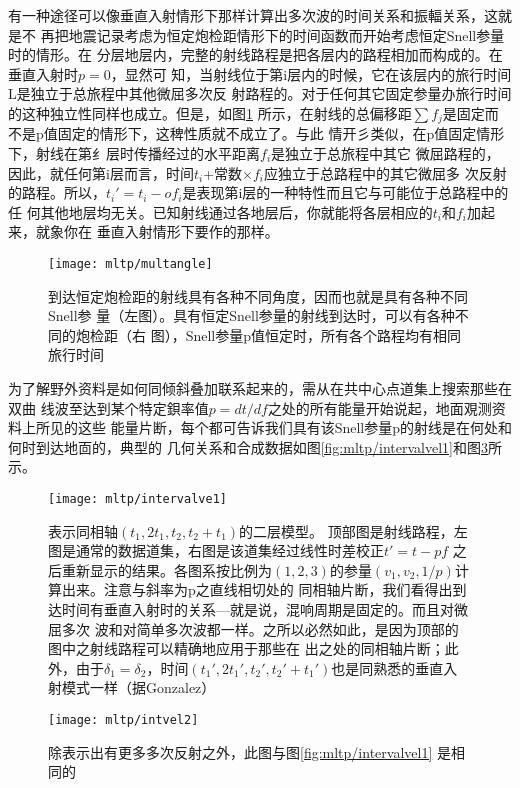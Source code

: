 有一种途径可以像垂直入射情形下那样计算出多次波的时间关系和振輻关系，这就是不
再把地震记录考虑为恒定炮检距情形下的时间函数而开始考虑恒定Snell参量时的情形。在
分层地层内，完整的射线路程是把各层内的路程相加而构成的。在垂直入射时$p=0$，显然可
知，当射线位于第i层内的时候，它在该层内的旅行时间L是独立于总旅程中其他微屈多次反
射路程的。对于任何其它固定参量办旅行时间的这种独立性同样也成立。但是，如图\ref{fig:mltp/multangle}
所示，在射线的总偏移距$\sum f_j$是固定而不是p值固定的情形下，这稗性质就不成立了。与此
情开彡类似，在p值固定情形下，射线在第纟层时传播经过的水平距离$f_i$是独立于总旅程中其它
微屈路程的，因此，就任何第i层而言，时间$t_i$+常数$\times f_i$应独立于总路程中的其它微屈多
次反射的路程。所以，$t_i'=t_i-of_i$是表现第i层的一种特性而且它与可能位于总路程中的任
何其他地层均无关。已知射线通过各地层后，你就能将各层相应的$t_i$和$f_i$加起来，就象你在
垂直入射情形下要作的那样。

\begin{figure}[H]
\centering
\texttt{[image: mltp/multangle]}
\caption[multangle]{到达恒定炮检距的射线具有各种不同角度，因而也就是具有各种不同Snell参
量（左图）。具有恒定Snell参量的射线到达时，可以有各种不同的炮检距（右
图），Snell参量p值恒定时，所有各个路程均有相同旅行时间
}
\label{fig:mltp/multangle}
\end{figure}

为了解野外资料是如何同倾斜叠加联系起来的，需从在共中心点道集上搜索那些在双曲
线波至达到某个特定鋇率值$p=dt/df$之处的所有能量开始说起，地面覌测资料上所见的这些
能量片断，每个都可告诉我们具有该Snell参量p的射线是在何处和何时到达地靣的，典型的
几何关系和合成数据如图\ref{fig:mltp/intervalvel1}和图\ref{fig:mltp/intvel2}所示。



\begin{figure}[H]
\centering
\texttt{[image: mltp/intervalve1]}
\caption[intervalve1]{表示同相轴$(t_1,2t_1,t_2,t_2+t_1)$的二层模型。
顶部图是射线路程，左图是通常的数据道集，右图是该道集经过线性时差校正$t'=t-pf$
之后重新显示的结果。各图系按比例为$(1,2,3)$的参量$(v_1,v_2,1/p)$计算出来。注意与斜率为p之直线相切处的
同相轴片断，我们看得出到达时间有垂直入射时的关系---就是说，混响周期是固定的。而且对微屈多次
波和对简单多次波都一样。之所以必然如此，是因为顶部的图中之射线路程可以精确地应用于那些在
出之处的同相轴片断；此外，由于$\delta_1=\delta_2$，时间$(t_1',2t_1',t_2',t_2'+t_1')$也是同熟悉的垂直入
射模式一样（据Gonzalez）
}
\label{fig:mltp/intervalve1}
\end{figure}

\begin{figure}[H]
\centering
\texttt{[image: mltp/intvel2]}
\caption[intvel2]{
除表示出有更多多次反射之外，此图与图\ref{fig:mltp/intervalvel1}
是相同的
}
\label{fig:mltp/intvel2}
\end{figure}

